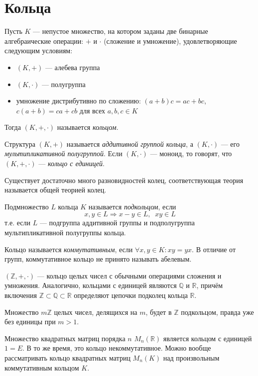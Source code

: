 \section{Кольца}

\begin{definition}
    Пусть $K$ --- непустое множество, на котором заданы две бинарные алгебраические операции: $+$ и $\cdot$ (сложение и умножение), удовлетворяющие следующим условиям:
    \begin{itemize}
        \item $(K,+)$ --- алебева группа
        \item $(K,\cdot)$ --- полугруппа
        \item умножение дистрибутивно по сложению: $(a+b)c=ac+bc$, $c(a+b)=ca+cb$ для всех $a,b,c \in K$
    \end{itemize}
    Тогда $(K,+,\cdot)$ называется {\it кольцом}.
\end{definition}

\begin{remark}
    Структура $(K,+)$ называется {\it аддитивной группой кольца}, а $(K,\cdot)$ --- его {\it мультипликативной полугруппой}. Если $(K,\cdot)$ --- моноид, то говорят, что $(K,+,\cdot)$ --- {\it кольцо с единицей}. 
\end{remark}

Существует достаточно много разновидностей колец, соответствующая теория называется общей теорией колец.

\begin{definition}
    Подмножество $L$ кольца $K$ называется {\it подкольцом}, если
    \begin{equation*}
        x,y\in L \Rightarrow x-y\in L, \;\; xy\in L
    \end{equation*}
    т.е. если $L$ --- подгруппа аддитивной группы и подполугруппа мультипликативной полугруппы кольца.
\end{definition}

Кольцо называется {\it коммутативным}, если $\forall x,y\in K:xy=yx$. В отличие от групп, коммутативное кольцо не принято называть абелевым.

\begin{example}
    $(\mathbb{Z},+,\cdot)$ --- кольцо целых чисел с обычными операциями сложения и умножения. Аналогично, кольцами с единицей являются $\mathbb{Q}$ и $\mathbb{R}$, причём включения $\mathbb{Z} \subset \mathbb{Q} \subset \mathbb{R}$ определяют цепочки подколец кольца $\mathbb{R}$.
\end{example}

\begin{example}
    Множество $m\mathbb{Z}$ целых чисел, делящихся на $m$, будет в $\mathbb{Z}$ подкольцом, правда уже без единицы при $m>1$.
\end{example}

\begin{example}
    Множество квадратных матриц порядка $n$ $M_n(\mathbb{R})$ является кольцом с единицей $1=E$. В то же время, это кольцо некоммутативное. Можно вообще рассматривать кольцо квадратных матриц $M_n(K)$ над произвольным коммутативным кольцом $K$.
\end{example}

